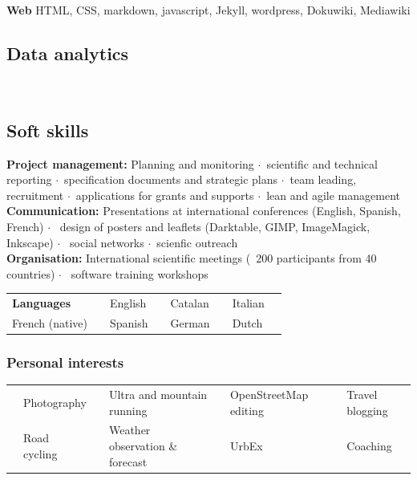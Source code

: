 \documentclass[svgnames]{article}
\newcommand{\fourstar}{\footnotesize \textcolor{CVorange}{\faStar\faStar\faStar\faStar}}
\newcommand{\threestar}{\footnotesize \textcolor{CVorange}{\faStar\faStar\faStar}\faStarO}
\newcommand{\twostar}{\footnotesize \textcolor{CVorange}{\faStar\faStar}\faStarO\faStarO}
\newcommand{\onestar}{\footnotesize \textcolor{CVorange}{\faStar}\faStarO\faStarO\faStarO}
\newcommand{\halfstar}{\footnotesize \textcolor{CVorange}{\faStarHalfO}\faStarO\faStarO\faStarO}
\newcommand{\sepa}{$\cdot$~}
\begin{document}
\noindent \textbf{Web} HTML, CSS, markdown, javascript, Jekyll, wordpress, Dokuwiki, Mediawiki

\subsection*{Data analytics}

     \\
   


\subsection*{Soft skills}
\textbf{Project management:} Planning and monitoring \sepa scientific and technical reporting \sepa specification documents and strategic plans \sepa team leading, recruitment \sepa applications for grants and supports \sepa lean and agile management\\
\textbf{Communication:} Presentations at international conferences (English, Spanish, French) $\cdot$~ design of posters and leaflets (Darktable, GIMP, ImageMagick, Inkscape) $\cdot$~ social networks \sepa scienfic outreach\\ 
\textbf{Organisation:} International scientific meetings (~200 participants from 40 countries) $\cdot$~ software training workshops\\
\begin{tabularx}{\textwidth}{@{}lrlrlrlr @{}}
\textbf{Languages }	& \dotfill	 	& English 	& \threestar 	& Catalan 	& \twostar	& Italian	& \onestar\\
French (native)		& \fourstar 	& Spanish	& \threestar	& German	& \onestar	& Dutch 	& \halfstar	\\			
\end{tabularx}

\subsubsection*{Personal interests}

\begin{tabular}{rlrlrlrl}
\faCameraRetro	& Photography & \faMapSigns & Ultra and mountain running 		& \faMapMarker & OpenStreetMap editing	& \faWordpress &Travel blogging \\
\Bicycle		& Road cycling& \faCloud 	 & Weather observation \& forecast	& \Industry    & UrbEx 					& & Coaching  			\\
\end{tabular}
	
\end{document}
